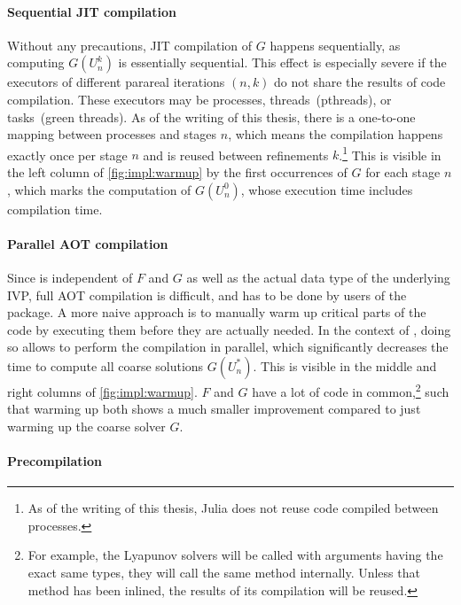 \paragraph{Sequential \ac{JIT} compilation}

Without any precautions,
\ac{JIT} compilation of $G$ happens sequentially,
as computing $G(U_n^k)$ is essentially sequential.
This effect is especially severe if the executors of different parareal iterations $(n,k)$ do not share the results of code compilation.
These executors may be processes, threads~(pthreads), or tasks~(green threads).
As of the writing of this thesis,
there is a one-to-one mapping between processes and stages $n$,
which means the compilation happens exactly once per stage $n$ and is reused between refinements $k$.\footnote{%
  As of the writing of this thesis, Julia does not reuse code compiled between processes.
}
This is visible in the left column of \autoref{fig:impl:warmup}
by the first occurrences of $G$ for each stage $n$,
which marks the computation of $G(U_n^0)$,
whose execution time includes compilation time.

\paragraph{Parallel \acs{AOT} compilation}

Since  is independent of $F$ and $G$ as well as the actual data type of the underlying \ac{IVP},
full \ac{AOT} compilation is difficult, and has to be done by users of the package.
A more naive approach is to manually warm up critical parts of the code by executing them before they are actually needed.
In the context of ,
doing so allows to perform the compilation in parallel,
which significantly decreases the time to compute all coarse solutions $G(U_n^*)$.
This is visible in the middle and right columns of \autoref{fig:impl:warmup}.
$F$ and $G$ have a lot of code in common,\footnote{%
  For example, the Lyapunov solvers will be called with arguments having the exact same types,
  \ie they will call the same method internally.
  Unless that method has been inlined, the results of its compilation will be reused.
}
such that warming up both shows a much smaller improvement compared to just warming up the coarse solver $G$.

\paragraph{Precompilation}

